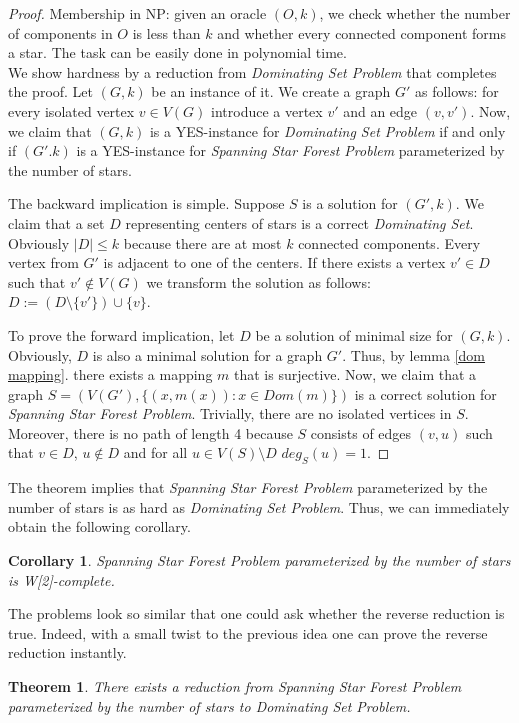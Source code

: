 \documentclass[en]{pracamgr}
\newtheorem{theorem}{Theorem}
\newtheorem{corollary}{Corollary}
\newcommand{\ssfp}{\emph{Spanning Star Forest Problem}}
\newcommand{\domset}{\emph{Dominating Set}}
\newcommand{\domsetp}{\emph{Dominating Set Problem}}
\newcommand{\kssf}{\emph{Spanning Star Forest Problem} parameterized by the number of stars}
\begin{document}
\begin{proof}
	Membership in NP: given an oracle $(O,k)$, we check whether the number of	components in $O$ is less than $k$ and whether every connected component	forms a star. The task can be easily done in polynomial time.\\
	
	We show hardness by a reduction from \domsetp{} that completes the proof. Let $(G,k)$ be an instance of it. We create a graph	$G'$ as follows: for every isolated vertex $v \in V(G)$ introduce a vertex $v'$ and an edge $(v,v')$. Now, we claim that $(G,k)$ is a YES-instance for \domsetp{} if and only if $(G'.k)$ is a YES-instance for \kssf{}. 
	
	The backward implication is simple. Suppose $S$ is a solution for $(G',k)$. We claim that a set $D$ representing centers of stars is a correct \domset{}. Obviously $|D| \leq k$ because there are at most $k$ connected components. Every vertex from $G'$ is adjacent to one of the centers. If there exists a vertex $v' \in D$ such that $v' \notin V(G)$ we transform the solution as follows: $D := (D \setminus \{v'\})\cup \{v\}$. 
	
	To prove the forward implication, let $D$ be a solution of minimal size for $(G,k)$. Obviously, $D$ is also a minimal solution for a graph $G'$. Thus, by lemma \ref{dom mapping}. there exists a mapping $m$ that is surjective. Now, we claim that a graph $S=(V(G'),\{(x,m(x)): x \in Dom(m)\})$ is a correct solution for \ssfp{}. Trivially, there are no isolated vertices in $S$. Moreover, there is no path of length 4 because $S$ consists of edges $(v,u)$ such that $v \in D$, $u \notin D$ and for all $u \in V(S) \setminus D$ $deg_S(u)=1$.
	
\end{proof}

The theorem implies that \kssf{} is as hard as \domsetp{}. Thus, we can immediately obtain the following corollary.

\begin{corollary}
	\kssf{} is {\normalfont W[2]-complete}.
\end{corollary}

The problems look so similar that one could ask whether the reverse reduction is true. Indeed, with a small twist to the previous idea one can prove the reverse reduction instantly.  

\begin{theorem}\label{ssf dom}
	There exists a reduction from \kssf{} to \domsetp{}.
\end{theorem}
\end{document}

